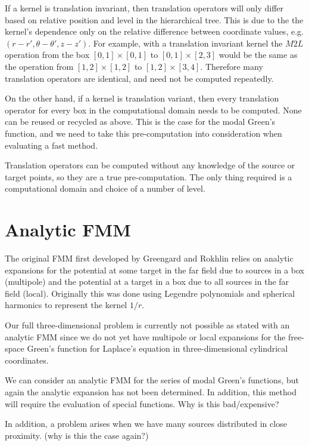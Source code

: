 \documentclass[11pt, oneside]{article}   	%
\begin{document}
If a kernel is translation invariant, then translation operators will only differ based on relative position and level in the hierarchical tree. This is due to the the kernel's dependence only on the relative difference between coordinate values, e.g. $(r-r',\theta-\theta',z-z')$. For example, with a translation invariant kernel the $M2L$ operation from the box $[0,1]\times[0,1]$ to $[0,1]\times[2,3]$ would be the same as the operation from $[1,2]\times[1,2]$ to $[1,2]\times[3,4]$. Therefore many translation operators are identical, and need not be computed repeatedly.

On the other hand, if a kernel is translation variant, then every translation operator for every box in the computational domain needs to be computed. None can be reused or recycled as above. This is the case for the modal Green's function, and we need to take this pre-computation into consideration when evaluating a fast method.

Translation operators can be computed without any knowledge of the source or target points, so they are a true pre-computation. The only thing required is a computational domain and choice of a number of level.

\section{Analytic FMM}
The original FMM \cite{GR} first developed by Greengard and Rokhlin relies on analytic expansions for the potential at some target in the far field due to sources in a box (multipole) and the potential at a target in a box due to all sources in the far field (local). Originally this was done using Legendre polynomials and spherical harmonics to represent the kernel $1/r$.

Our full three-dimensional problem is currently not possible as stated with an analytic FMM since we do not yet have multipole or local expansions for the free-space Green's function for Laplace's equation in three-dimensional cylindrical coordinates.

We can consider an analytic FMM for the series of modal Green's functions, but again the analytic expansion has not been determined. In addition, this method will require the evaluation of special functions. Why is this bad/expensive?

In addition, a problem arises when we have many sources distributed in close proximity. (why is this the case again?)
\end{document}
